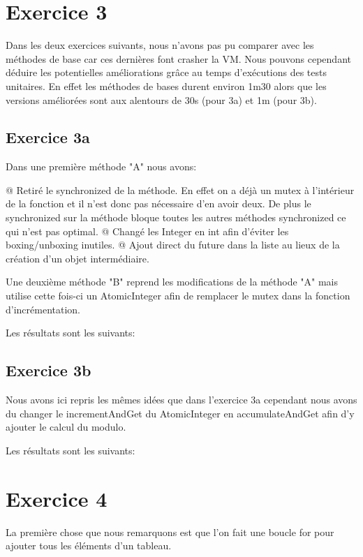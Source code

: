 \documentclass{report}
\begin{document}
	
	\section{Exercice 3}
		Dans les deux exercices suivants, nous n'avons pas pu comparer avec les méthodes de base car ces dernières font crasher la VM.
		Nous pouvons cependant déduire les potentielles améliorations grâce au temps d'exécutions des tests unitaires.
		En effet les méthodes de bases durent environ 1m30 alors que les versions améliorées sont aux alentours de 30s (pour 3a) et 1m (pour 3b).
	
		\subsection{Exercice 3a}
			Dans une première méthode "A" nous avons:
			\begin{easylist}
				@ Retiré le synchronized de la méthode. En effet on a déjà un mutex à l'intérieur de la fonction et il n'est donc pas nécessaire d'en avoir deux. De plus le synchronized sur la méthode bloque toutes les autres méthodes synchronized ce qui n'est pas optimal.
				@ Changé les Integer en int afin d'éviter les boxing/unboxing inutiles.
				@ Ajout direct du future dans la liste au lieux de la création d'un objet intermédiaire.
			\end{easylist}
			
			Une deuxième méthode "B" reprend les modifications de la méthode "A" mais utilise cette fois-ci un AtomicInteger afin de remplacer le mutex dans la fonction d'incrémentation.
			
			Les résultats sont les suivants:
			
		
		\subsection{Exercice 3b}
			Nous avons ici repris les mêmes idées que dans l'exercice 3a cependant nous avons du changer le incrementAndGet du AtomicInteger en accumulateAndGet afin d'y ajouter le calcul du modulo.
			
			Les résultats sont les suivants:
			
			
			

	\section{Exercice 4}
		La première chose que nous remarquons est que l'on fait une boucle for pour ajouter tous les éléments d'un tableau.
		
\end{document}
